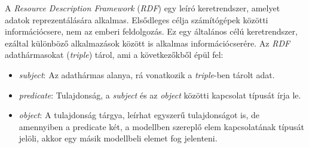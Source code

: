 A \emph{Resource Description Framework} (\emph{RDF}) egy leíró keretrendszer, amelyet adatok reprezentálására alkalmas. Elsődleges célja számítógépek közötti információcsere, nem az emberi feldolgozás. Ez egy általános célú keretrendszer, ezáltal különböző alkalmazások között is alkalmas információcserére. Az \emph{RDF} adathármasokat (\emph{triple}) tárol, ami a következőkből épül fel:
\begin{itemize}
	\item \emph{subject}: Az adathármas alanya, rá vonatkozik a \emph{triple}-ben tárolt adat.
	\item \emph{predicate}: Tulajdonság, a \emph{subject} és az \emph{object} közötti kapcsolat típusát írja le.
	\item \emph{object}: A tulajdonság tárgya, leírhat egyszerű tulajdonságot is, de amennyiben a predicate két, a modellben szereplő elem kapcsolatának típusát jelöli, akkor egy másik modellbeli elemet fog jelenteni.
\end{itemize}

